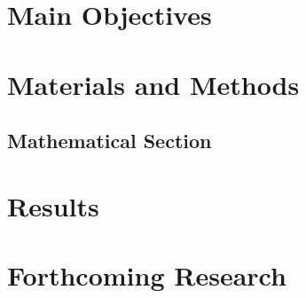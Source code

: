 


\section*{Main Objectives}



\section*{Materials and Methods}



\subsection*{Mathematical Section}




\section*{Results}








\section*{Forthcoming Research}



